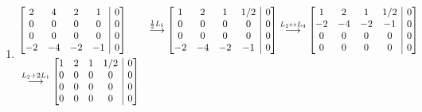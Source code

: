 \documentclass[12pt,a4paper]{article}
\makeatletter
\newenvironment{amatrix}[1]{%
  \left[\begin{array}{@{}*{#1}{c}|c@{}}
}{%
  \end{array}\right]
}
\newcommand{\grstep}[2][\relax]{%
   \ensuremath{\mathrel{
       {\mathop{\longrightarrow}\limits^{#2\mathstrut}_{
                                     \begin{subarray}{l} #1 \end{subarray}}}}}}
\newcommand{\swap}{\leftrightarrow}
\makeatother
\begin{document}
\begin{ExerciseList}
\begin{enumerate}
\item
\begin{align*}
& \begin{amatrix}{4}
 2 &  4 &  2 & 1 & 0\\
 0 &  0 &  0 & 0 & 0\\
 0 &  0 &  0 & 0 & 0\\
-2 & -4 & -2 & -1 & 0
\end{amatrix}
& \grstep{ \frac{1}{2}L_1 }
\begin{amatrix}{4}
 1 &  2 &  1 & 1/2 & 0\\
 0 &  0 &  0 & 0 & 0\\
 0 &  0 &  0 & 0 & 0\\
-2 & -4 & -2 & -1 & 0
\end{amatrix}
\grstep{ L_2 \swap L_4 }
\begin{amatrix}{4}
 1 &  2 &  1 & 1/2 & 0\\
-2 & -4 & -2 & -1 & 0\\
 0 &  0 &  0 & 0 & 0\\
 0 &  0 &  0 & 0 & 0
\end{amatrix}\\
& \grstep{ L_2 +2 L_1 }
\begin{amatrix}{4}
 1 &  2 &  1 & 1/2 & 0\\
 0 &  0 &  0 & 0 & 0\\
 0 &  0 &  0 & 0 & 0\\
 0 &  0 &  0 & 0 & 0
\end{amatrix}
\end{align*}


\end{enumerate}
\end{ExerciseList}
\end{document}
